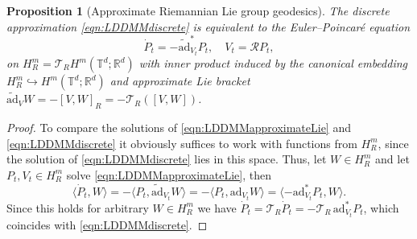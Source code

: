 \documentclass[a4paper, 12pt]{article}
\newtheorem{proposition}[theorem]{Proposition}
\newcommand{\R}{\mathbb{R}}
\newcommand{\T}{\mathbb{T}}
\newcommand{\Riesz}{\mathcal{R}}
\newcommand{\adjointDer}{\mathrm{ad}}
\newcommand{\trunc}[1][R]{\mathcal{T}_{#1}}
\newcommand{\truncSpace}{H^m_R}
\newcommand{\IPHm}[2]{(\!(#1,#2)\!)_{H^m}} %
\begin{document}
\begin{proposition}[Approximate Riemannian Lie group geodesics]
The discrete approximation \eqref{eqn:LDDMMdiscrete} is equivalent to the Euler--Poincar\'e equation
\begin{equation}\label{eqn:LDDMMapproximateLie}
\dot P_t=-\widetilde{\adjointDer}_{V_t}^*P_t,\quad V_t=\Riesz P_t,
\end{equation}
on $\truncSpace=\trunc H^m(\T^d;\R^d)$ with inner product induced by the canonical embedding $\truncSpace\hookrightarrow H^m(\T^d;\R^d)$
and approximate Lie bracket $\widetilde{\adjointDer}_{V}W=-[V,W]_R=-\trunc([V,W])$.
\end{proposition}
\begin{proof}
To compare the solutions of \eqref{eqn:LDDMMapproximateLie} and \eqref{eqn:LDDMMdiscrete} it obviously suffices to work with functions from $\truncSpace$,
since the solution of \eqref{eqn:LDDMMdiscrete} lies in this space.
Thus, let $W\in\truncSpace$ and let $P_t,V_t\in\truncSpace$ solve \eqref{eqn:LDDMMapproximateLie}, then
\begin{equation*}
\langle\dot P_t,W\rangle
=-\langle P_t,\widetilde{\adjointDer}_{V_t}W\rangle
=-\langle P_t,\adjointDer_{V_t}W\rangle
=\langle-\adjointDer_{V_t}^*P_t,W\rangle.%
\end{equation*}
Since this holds for arbitrary $W\in\truncSpace$ we have $\dot P_t=\trunc\dot P_t=-\trunc\,\adjointDer_{V_t}^*P_t$, which coincides with \eqref{eqn:LDDMMdiscrete}.
\end{proof}
\end{document}
